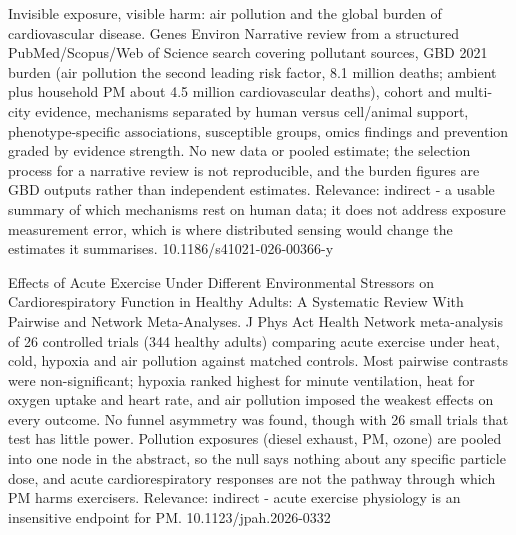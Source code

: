 \documentclass[10pt]{article}
\begin{document}
{Invisible exposure, visible harm: air pollution and the global burden of cardiovascular disease.}
{Genes Environ}
{Narrative review from a structured PubMed/Scopus/Web of Science search covering pollutant sources, GBD 2021 burden (air pollution the second leading risk factor, 8.1 million deaths; ambient plus household PM about 4.5 million cardiovascular deaths), cohort and multi-city evidence, mechanisms separated by human versus cell/animal support, phenotype-specific associations, susceptible groups, omics findings and prevention graded by evidence strength. No new data or pooled estimate; the selection process for a narrative review is not reproducible, and the burden figures are GBD outputs rather than independent estimates. Relevance: indirect - a usable summary of which mechanisms rest on human data; it does not address exposure measurement error, which is where distributed sensing would change the estimates it summarises.}
{10.1186/s41021-026-00366-y}

{Effects of Acute Exercise Under Different Environmental Stressors on Cardiorespiratory Function in Healthy Adults: A Systematic Review With Pairwise and Network Meta-Analyses.}
{J Phys Act Health}
{Network meta-analysis of 26 controlled trials (344 healthy adults) comparing acute exercise under heat, cold, hypoxia and air pollution against matched controls. Most pairwise contrasts were non-significant; hypoxia ranked highest for minute ventilation, heat for oxygen uptake and heart rate, and air pollution imposed the weakest effects on every outcome. No funnel asymmetry was found, though with 26 small trials that test has little power. Pollution exposures (diesel exhaust, PM, ozone) are pooled into one node in the abstract, so the null says nothing about any specific particle dose, and acute cardiorespiratory responses are not the pathway through which PM harms exercisers. Relevance: indirect - acute exercise physiology is an insensitive endpoint for PM.}
{10.1123/jpah.2026-0332}

\par{}\baselineskip{}\baselineskip
{}
\end{document}
